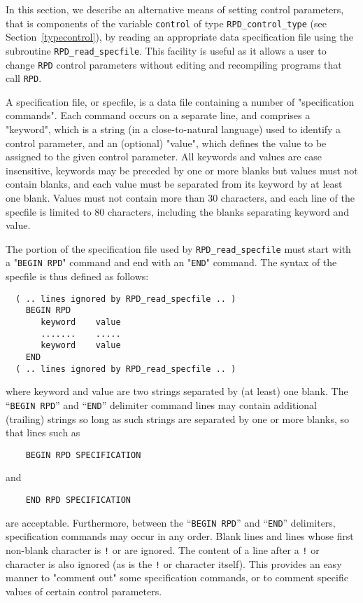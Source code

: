 \documentclass{galahad}
\newcommand{\packagename}{RPD}
\begin{document}

\galfeatures
\noindent In this section, we describe an alternative means of setting
control parameters, that is components of the variable {\tt control} of type
{\tt \packagename\_control\_type}
(see Section~\ref{typecontrol}),
by reading an appropriate data specification file using the
subroutine {\tt \packagename\_read\_specfile}. This facility
is useful as it allows a user to change  {\tt \packagename} control parameters
without editing and recompiling programs that call {\tt \packagename}.

A specification file, or specfile, is a data file containing a number of
"specification commands". Each command occurs on a separate line,
and comprises a "keyword",
which is a string (in a close-to-natural language) used to identify a
control parameter, and
an (optional) "value", which defines the value to be assigned to the given
control parameter. All keywords and values are case insensitive,
keywords may be preceded by one or more blanks but
values must not contain blanks, and
each value must be separated from its keyword by at least one blank.
Values must not contain more than 30 characters, and
each line of the specfile is limited to 80 characters,
including the blanks separating keyword and value.

The portion of the specification file used by
{\tt \packagename\_read\_specfile}
must start
with a "{\tt BEGIN \packagename}" command and end with an
"{\tt END}" command.  The syntax of the specfile is thus defined as follows:
\begin{verbatim}
  ( .. lines ignored by RPD_read_specfile .. )
    BEGIN RPD
       keyword    value
       .......    .....
       keyword    value
    END
  ( .. lines ignored by RPD_read_specfile .. )
\end{verbatim}
where keyword and value are two strings separated by (at least) one blank.
The ``{\tt BEGIN \packagename}'' and ``{\tt END}'' delimiter command lines
may contain additional (trailing) strings so long as such strings are
separated by one or more blanks, so that lines such as
\begin{verbatim}
    BEGIN RPD SPECIFICATION
\end{verbatim}
and
\begin{verbatim}
    END RPD SPECIFICATION
\end{verbatim}
are acceptable. Furthermore,
between the
``{\tt BEGIN \packagename}'' and ``{\tt END}'' delimiters,
specification commands may occur in any order.  Blank lines and
lines whose first non-blank character is {\tt !} or {\tt *} are ignored.
The content
of a line after a {\tt !} or {\tt *} character is also
ignored (as is the {\tt !} or {\tt *}
character itself). This provides an easy manner to "comment out" some
specification commands, or to comment specific values
of certain control parameters.
\end{document}
